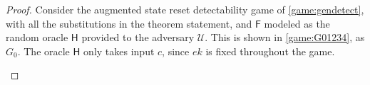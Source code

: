 \begin{proof}
Consider the augmented state reset detectability game of \autoref{game:gendetect}, with all the substitutions in the theorem statement, and $\mathsf{F}$ modeled as the random oracle $\mathsf{H}$ provided to the adversary $\mathcal{U}$. This is shown in \autoref{game:G01234}, as $G_0$. The oracle $\mathsf{H}$ only takes input $c$, since $ek$ is fixed throughout the game.

\begin{figure}[t]
\centering
\begin{pchstack}
\begin{pcvstack}
\pcvspace
{}
\pcvspace
{}
\end{pcvstack}
\pchspace
\begin{pcvstack}
\end{pcvstack}
\end{pchstack}
\end{figure}
\end{proof}
